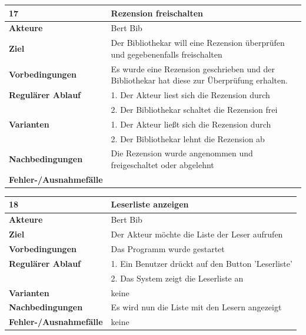 \documentclass[fontsize=12pt,paper=a4,twoside]{scrartcl}
\begin{document}
\begin{table}[htbp]
\label{17}
\begin{tabular}{|l|p{10cm}|}
\hline 
\textbf{17} & \textbf{Rezension freischalten} \\ \hline
\textbf{Akteure} & Bert Bib\\ \hline
\textbf{Ziel} & Der Bibliothekar will eine Rezension überprüfen und gegebenenfalls freischalten \\ \hline
\textbf{Vorbedingungen} & Es wurde eine Rezension geschrieben und der Bibliothekar hat diese zur Überprüfung erhalten. \\ \hline
\textbf{Regulärer Ablauf} & 
1. Der Akteur liest sich die Rezension durch \\
&2. Der Bibliothekar schaltet die Rezension frei\\
\hline
\textbf{Varianten} & 
1. Der Akteur ließt sich die Rezension durch \\
&2. Der Bibliothekar lehnt die Rezension ab \\ \hline
\textbf{Nachbedingungen} & Die Rezension wurde angenommen und freigeschaltet oder abgelehnt\\ \hline
\textbf{Fehler-/Ausnahmefälle} & \\
\hline
\end{tabular}
\end{table}

\begin{table}[htbp]
\label{18}
\begin{tabular}{|l|p{10cm}|}
\hline 
\textbf{18} & \textbf{Leserliste anzeigen} \\ \hline
\textbf{Akteure} & Bert Bib\\ \hline
\textbf{Ziel} & Der Akteur möchte die Liste der Leser aufrufen  \\ \hline
\textbf{Vorbedingungen} & Das Programm wurde gestartet  \\ \hline
\textbf{Regulärer Ablauf} & 
1. Ein Benutzer drückt auf den Button 'Leserliste' \\
&2. Das System zeigt die Leserliste an\\
\hline
\textbf{Varianten} & 
keine \\ \hline
\textbf{Nachbedingungen} & Es wird nun die Liste mit den Lesern angezeigt \\ \hline
\textbf{Fehler-/Ausnahmefälle} & keine\\
\hline
\end{tabular}
\end{table}
\end{document}
